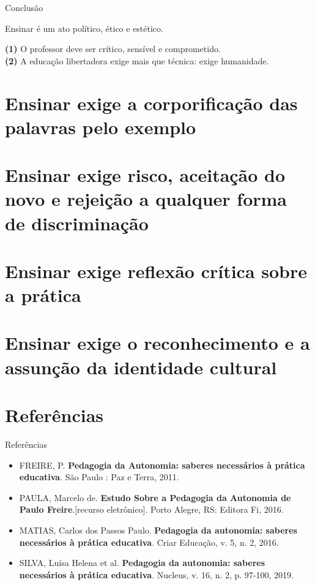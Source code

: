 \documentclass[12pt]{beamer}
\begin{document}
	\begin{frame}{Conclusão}
		
		\begin{alertblock}{\justifying Ensinar é um ato político, ético e estético.}
			
			\justifying
			\textbf{(1)} O professor deve ser crítico, sensível e comprometido. \\
			\textbf{(2)} A educação libertadora exige mais que técnica: exige humanidade.\\
	
		\end{alertblock}
		
	\end{frame}
\section{Ensinar exige a corporificação das palavras pelo exemplo}
\section{Ensinar exige risco, aceitação do novo e rejeição a qualquer forma de discriminação}
\section{Ensinar exige reflexão crítica sobre a prática}
\section{Ensinar exige o reconhecimento e a assunção da identidade cultural}

\section{Referências}

\begin{frame}{Referências}
	
	\begin{itemize}
		\justifying
		\item FREIRE, P. \textbf{Pedagogia da Autonomia: saberes necessários à prática educativa}. São Paulo : Paz e Terra, 2011.
		
		\item PAULA, Marcelo de. \textbf{Estudo Sobre a Pedagogia da Autonomia de Paulo Freire}.[recurso eletrônico]. Porto Alegre, RS: Editora Fi, 2016. 
		
		\item MATIAS, Carlos dos Passos Paulo. \textbf{Pedagogia da autonomia: saberes necessários à prática educativa}. Criar Educação, v. 5, n. 2, 2016.
		
		\item SILVA, Luísa Helena et al. \textbf{Pedagogia da autonomia: saberes necessários à prática educativa}. Nucleus, v. 16, n. 2, p. 97-100, 2019.
		
	\end{itemize}
\end{frame}
\end{document}
